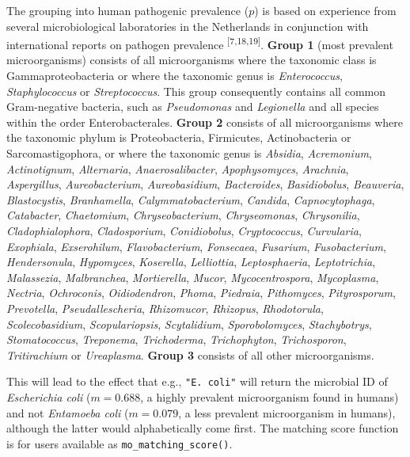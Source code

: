 \documentclass[
]{book}
\begin{document}
The grouping into human pathogenic prevalence (\(p\)) is based on experience from several microbiological laboratories in the Netherlands in conjunction with international reports on pathogen prevalence \textsuperscript{{[}7,18,19{]}}. \textbf{Group 1} (most prevalent microorganisms) consists of all microorganisms where the taxonomic class is Gammaproteobacteria or where the taxonomic genus is \emph{Enterococcus}, \emph{Staphylococcus} or \emph{Streptococcus}. This group consequently contains all common Gram-negative bacteria, such as \emph{Pseudomonas} and \emph{Legionella} and all species within the order Enterobacterales. \textbf{Group 2} consists of all microorganisms where the taxonomic phylum is Proteobacteria, Firmicutes, Actinobacteria or Sarcomastigophora, or where the taxonomic genus is \emph{Absidia}, \emph{Acremonium}, \emph{Actinotignum}, \emph{Alternaria}, \emph{Anaerosalibacter}, \emph{Apophysomyces}, \emph{Arachnia}, \emph{Aspergillus}, \emph{Aureobacterium}, \emph{Aureobasidium}, \emph{Bacteroides}, \emph{Basidiobolus}, \emph{Beauveria}, \emph{Blastocystis}, \emph{Branhamella}, \emph{Calymmatobacterium}, \emph{Candida}, \emph{Capnocytophaga}, \emph{Catabacter}, \emph{Chaetomium}, \emph{Chryseobacterium}, \emph{Chryseomonas}, \emph{Chrysonilia}, \emph{Cladophialophora}, \emph{Cladosporium}, \emph{Conidiobolus}, \emph{Cryptococcus}, \emph{Curvularia}, \emph{Exophiala}, \emph{Exserohilum}, \emph{Flavobacterium}, \emph{Fonsecaea}, \emph{Fusarium}, \emph{Fusobacterium}, \emph{Hendersonula}, \emph{Hypomyces}, \emph{Koserella}, \emph{Lelliottia}, \emph{Leptosphaeria}, \emph{Leptotrichia}, \emph{Malassezia}, \emph{Malbranchea}, \emph{Mortierella}, \emph{Mucor}, \emph{Mycocentrospora}, \emph{Mycoplasma}, \emph{Nectria}, \emph{Ochroconis}, \emph{Oidiodendron}, \emph{Phoma}, \emph{Piedraia}, \emph{Pithomyces}, \emph{Pityrosporum}, \emph{Prevotella}, \emph{Pseudallescheria}, \emph{Rhizomucor}, \emph{Rhizopus}, \emph{Rhodotorula}, \emph{Scolecobasidium}, \emph{Scopulariopsis}, \emph{Scytalidium}, \emph{Sporobolomyces}, \emph{Stachybotrys}, \emph{Stomatococcus}, \emph{Treponema}, \emph{Trichoderma}, \emph{Trichophyton}, \emph{Trichosporon}, \emph{Tritirachium} or \emph{Ureaplasma}. \textbf{Group 3} consists of all other microorganisms.

This will lead to the effect that e.g., \texttt{"E.\ coli"} will return the microbial ID of \emph{Escherichia coli} (\(m = 0.688\), a highly prevalent microorganism found in humans) and not \emph{Entamoeba coli} (\(m = 0.079\), a less prevalent microorganism in humans), although the latter would alphabetically come first. The matching score function is for users available as \texttt{mo\_matching\_score()}.
\end{document}
